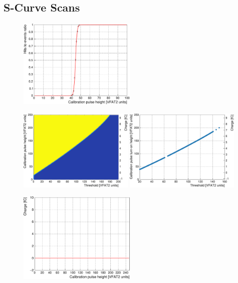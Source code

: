     \subsection{S-Curve Scans}

      \begin{figure}[h!]
        \centering
        \includegraphics[width=0.5\textwidth]{img/plots/cSCurve_T25-crop}
        \caption{}
        \label{fig:II-5-qualification-scurve}
      \end{figure}

      \begin{figure}[h!]
        \centering
        \includegraphics[width=0.49\textwidth]{img/plots/cSCurve_ThresholdVCal-crop}
        \includegraphics[width=0.49\textwidth]{img/plots/cSCurve_TurnOn-crop}
        \caption{}
        \label{fig:II-5-qualification-scurves}
      \end{figure}

      \begin{figure}[h!]
        \centering
        \includegraphics[width=0.5\textwidth]{img/plots/cCal_Charge-crop}
        \caption{}
        \label{fig:II-5-qualification-calcharge}
      \end{figure}

